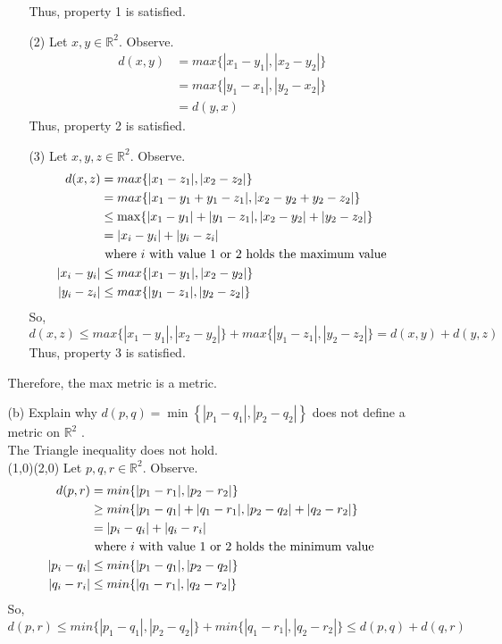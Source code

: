 \documentclass[12pt]{article}
\newcommand{\R}{\mathbb{R}}
\begin{document}
\begin{enumerate}
\begin{enumerate}
\begin{enumerate}
			Thus, property 1 is satisfied.
			\item[(2)] Let $ x,y\in \R^2 $. Observe.
			\begin{align*}
			d(x,y) &= max\{|x_1-y_1|,|x_2-y_2|\}\\
			&= max\{|y_1-x_1|,|y_2-x_2|\}\\
			&= d(y,x)
			\end{align*}
			Thus, property 2 is satisfied.
			\item[(3)] Let $ x,y,z \in \R^2 $. Observe.
			\begin{align*}
			d(x,z)  &= max\{|x_1-z_1|,|x_2-z_2|\}\\
					&= max\{|x_1-y_1+y_1-z_1|,|x_2-y_2+y_2-z_2|\}\\
					&\leq \max\{|x_1-y_1|+|y_1-z_1|,|x_2-y_2|+|y_2-z_2|\}\\
					&= |x_i-y_i|+|y_i-z_i| \\
					&\text{ where $ i $ with value 1 or 2 holds the maximum value}\\
			|x_i-y_i|&\leq max\{|x_1-y_1|,|x_2-y_2|\}\\
			|y_i-z_i|&\leq max\{|y_1-z_1|,|y_2-z_2|\}
			\end{align*}
			So, 
				\[d(x,z) \leq max\{|x_1-y_1|,|x_2-y_2|\} + max\{|y_1-z_1|,|y_2-z_2|\}=d(x,y)+d(y,z)\]
			Thus, property 3 is satisfied.
		\end{enumerate}	
		Therefore, the max metric is a metric.
		\item[(b)] Explain why $d ( p , q ) = \min \left\{ \left| p _ { 1 } - q _ { 1 } \right| , \left| p _ { 2 } - q _ { 2 } \right| \right\}$ does not define a metric on $\mathbb { R } ^ { 2 }$ .\\
		The Triangle inequality does not hold.\\ (1,0)(2,0)
		Let $ p,q,r \in \R^2 $. Observe.
		\begin{align*}
			d(p,r) &= min\{|p_1-r_1|,|p_2-r_2|\}\\
				   &\geq min\{|p_1-q_1|+|q_1-r_1|,|p_2-q_2|+|q_2-r_2|\}\\
				   &= |p_i-q_i|+|q_i-r_i|\\
				   &\text{ where $ i $ with value 1 or 2 holds the minimum value}\\
				    |p_i-q_i| &\leq min\{|p_1-q_1|,|p_2-q_2|\}\\
				    |q_i-r_i| &\leq min\{|q_1-r_1|,|q_2-r_2|\}
		\end{align*}
		So, 
			\[d(p,r) \leq min\{|p_1-q_1|,|p_2-q_2|\} + min\{|q_1-r_1|,|q_2-r_2|\}\leq d(p,q)+d(q,r)\]
	\end{enumerate}

\end{enumerate}
\end{document}
